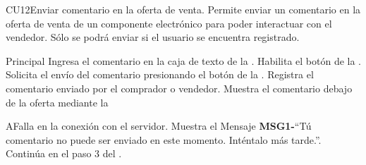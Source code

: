 
% 



	\begin{UseCase}{CU12}{Enviar comentario en la oferta de venta.}{
		Permite enviar un comentario en la oferta de venta de un componente electrónico para poder interactuar con el vendedor. Sólo se podrá enviar si el usuario se encuentra registrado.
	}
		
	\end{UseCase}

	\begin{UCtrayectoria}{Principal}
		\UCpaso[\UCactor] Ingresa el comentario en la caja de texto de la .
		\UCpaso Habilita el botón  de la .
		\UCpaso[\UCactor] Solicita el envío del comentario presionando el botón  de la  .
		\UCpaso Registra el comentario enviado por el comprador o vendedor.
		\UCpaso Muestra el comentario debajo de la oferta mediante la 
\end{UCtrayectoria}
		\begin{UCtrayectoriaA}{A}{Falla en la conexión con el servidor.}
			\UCpaso Muestra el Mensaje {\bf MSG1-}``Tú comentario no puede ser enviado en este momento. Inténtalo más tarde.''.
			\UCpaso Continúa en el paso 3 del .
		\end{UCtrayectoriaA}
		
